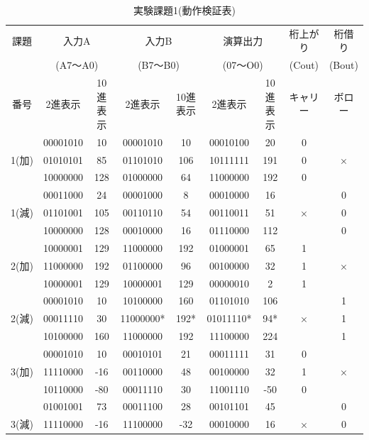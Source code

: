 \documentclass[11pt,a4j]{jsarticle}
\begin{document}
  \begin{table}[htb]
  \begin{center}
    \caption{実験課題1(動作検証表)}
    \begin{tabular}{|c|c|c|c|c|c|c|c|c|} \hline
課題 & \multicolumn{2}{|c|}{入力A} & \multicolumn{2}{|c|}{入力B} & \multicolumn{2}{|c|}{演算出力} & 桁上がり & 桁借り\\
 & \multicolumn{2}{|c|}{(A7～A0)} & \multicolumn{2}{|c|}{(B7～B0)} & \multicolumn{2}{|c|}{(07～O0)} & (Cout) & (Bout) \\ \cline{2-7}
番号 & 2進表示 & 10進表示 & 2進表示 & 10進表示 & 2進表示 & 10進表示 & キャリー & ボロー \\ \hline
 & 00001010 & 10 & 00001010 &10  &00010100  & 20 & 0 &  \\ \cline{2-8}
1(加) & 01010101 & 85 & 01101010 &106  &10111111  & 191 & 0 & × \\ \cline{2-8}
 & 10000000 & 128 & 01000000 &64  & 11000000 & 192 & 0 &  \\ \hline
 & 00011000 &24  & 00001000 &8  &00010000  & 16 &  & 0 \\ \cline{2-7}\cline{9-9}
1(減) & 01101001 & 105 &00110110  &54  & 00110011 & 51 & × & 0 \\ \cline{2-7}\cline{9-9}
 & 10000000 & 128 &00010000  & 16 &01110000  & 112 &  & 0 \\ \hline
 & 10000001 & 129 &11000000  & 192 &01000001  &65  & 1 &  \\ \cline{2-8}
2(加) & 11000000 & 192 & 01100000 &96  &00100000  &32  & 1 & × \\ \cline{2-8}
 & 10000001 &  129& 10000001 & 129 &00000010  & 2 & 1 &  \\ \hline
 & 00001010 &10  &10100000  &160  &01101010  &106  &  & 1 \\ \cline{2-7}\cline{9-9}
2(減) & 00011110 &  30& 11000000* & 192* & 01011110* & 94* & × & 1 \\ \cline{2-7}\cline{9-9}
 & 10100000 & 160 &11000000  & 192 & 11100000 &224  &  & 1 \\ \hline
 &00001010  & 10 & 00010101 &21  & 00011111 &31  & 0 &  \\ \cline{2-8}
3(加) & 11110000 &-16  & 00110000 & 48 & 00100000 & 32 & 1 & × \\ \cline{2-8}
 & 10110000 & -80 &00011110  & 30 & 11001110 &-50  & 0 &  \\ \hline
 & 01001001 & 73 & 00011100 &28  & 00101101 &45  &  & 0 \\ \cline{2-7}\cline{9-9}
3(減) & 11110000 & -16 &11100000  & -32 &00010000  &16  & × & 0 \\ \cline{2-7}\cline{9-9}

\end{tabular}
\end{center}
\end{table}
\end{document}
